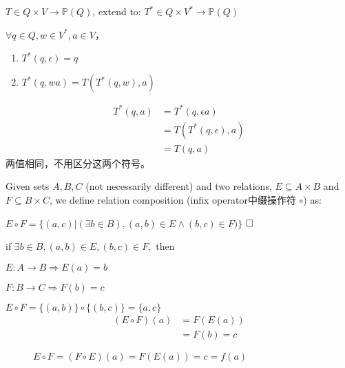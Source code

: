 \begin{note}
	$T\in Q\times V\to \mathbb{P}(Q)$,	extend to: $T^\ast \in Q\times V^\ast \to \mathbb{P}(Q)$
	
	$\forall q\in Q, w\in V^{\ast}, a\in V$，
	\begin{enumerate}
		\item $T^\ast(q,\epsilon) = q$
		\item $T^\ast(q,wa) = T(T^\ast(q,w),a)$
	\end{enumerate}
	\begin{align*}
	T^\ast(q,a) &= T^\ast(q,\epsilon a) \\
	&= T(T^\ast(q,\epsilon),a) \\
	&= T(q,a)
	\end{align*}
	两值相同，不用区分这两个符号。 
\end{note}

\begin{convention}\label{con:comp} Given sets $A,B,C$ (not necessarily different) and two relations, $E\subseteq A\times B$ and $F\subseteq B\times C$, we define relation composition (infix operator中缀操作符 $\circ$) as:

$E\circ F = \{(a,c)|(\exists b\in B),(a,b)\in E\land (b,c)\in F)\}$  $\hfill\square$
\end{convention}

\begin{note} if $\exists b\in B,(a,b)\in E,(b,c)\in F,$ then
	
	$E:A\to B\Rightarrow E(a)=b$
	
	$F:B\to C\Rightarrow F(b)=c$
	
	$E\circ F =\{(a,b)\}\circ \{(b,c)\}=\{a,c\}$
	\begin{align*}
	(E\circ F)(a) &=F(E(a)) \\
	&=F(b) = c
	\end{align*}
	\begin{figure}[hbtp]
		\caption{$E\circ F= (F\circ E)(a)=F(E(a)) = {c} =f(a)$}
	\end{figure}
\end{note}

